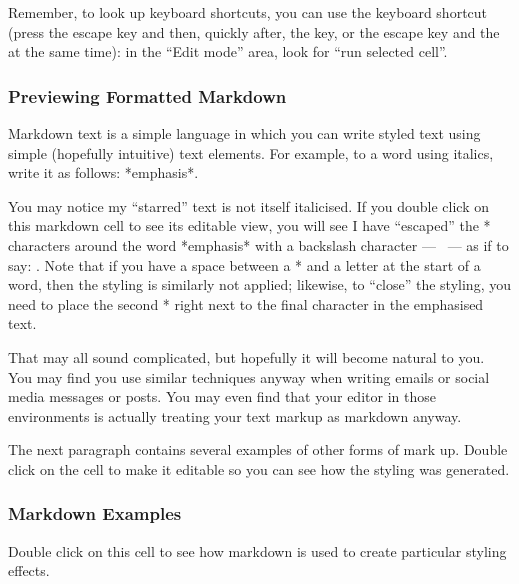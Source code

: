 \documentclass[letterpaper,10pt,english]{sphinxmanual}
\begin{document}
Remember, to look up keyboard shortcuts, you can use the  keyboard shortcut (press the escape key and then, quickly after, the  key, or the escape key and the  at the same time): in the “Edit mode” area, look for “run selected cell”.


\subsubsection{Previewing Formatted Markdown}
\label{\detokenize{content/00_READ_ME_FIRST/Section_00_06_RoboLab_Environment:Previewing-Formatted-Markdown}}
Markdown text is a simple  language in which you can write styled text using simple (hopefully intuitive) text elements. For example, to  a word using italics, write it as follows: *emphasis*.

You may notice my “starred” text is not itself italicised. If you double click on this markdown cell to see its editable view, you will see I have “escaped” the * characters around the word *emphasis* with a backslash character —  — as if to say: . Note that if you have a space between a * and a letter at the start of a word, then the styling is similarly not applied; likewise, to “close” the styling, you need to place the second * right next to the final character in
the emphasised text.


That may all sound complicated, but hopefully it will become natural to you. You may find you use similar techniques anyway when writing emails or social media messages or posts. You may even find that your editor in those environments is actually treating your text markup as markdown anyway.

The next paragraph contains several examples of other forms of mark up. Double click on the cell to make it editable so you can see how the styling was generated.


\subsubsection{Markdown Examples}
\label{\detokenize{content/00_READ_ME_FIRST/Section_00_06_RoboLab_Environment:Markdown-Examples}}
Double click on this cell to see how markdown is used to create particular styling effects.
\end{document}
